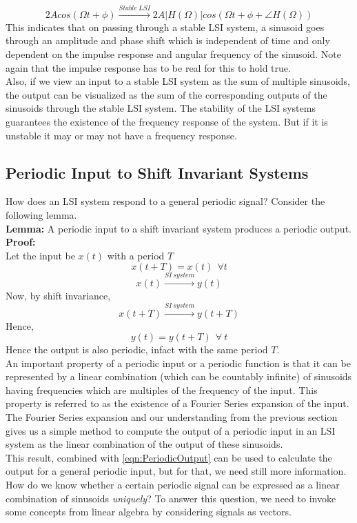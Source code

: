 \[
2Acos(\Omega t + \phi) \xrightarrow{Stable\ LSI} 2A|H(\Omega)|cos(\Omega t + \phi + \angle H(\Omega))
\]
This indicates that on passing through a stable LSI system, a sinusoid goes through an amplitude and phase shift which is independent of time and only dependent on the impulse response and angular frequency of the sinusoid. Note again that the impulse response has to be real for this to hold true.\\
Also, if we view an input to a stable LSI system as the sum of multiple sinusoids, the output can be visualized as the sum of the corresponding outputs of the sinusoids through the stable LSI system. The stability of the LSI systems guarantees the existence of the frequency response of the system. But if it is unstable it may or may not have a frequency response.
\subsection{Periodic Input to Shift Invariant Systems}
How does an LSI system respond to a general periodic signal? Consider the following lemma.\\
\textbf{Lemma:} A periodic input to a shift invariant system produces a periodic output.\\
\textbf{Proof:}\\
Let the input be $x(t)$ with a period $T$
\[x(t+T) = x(t)\ \ \forall t\]
\[x(t) \xrightarrow{SI\ system} y(t) \]
Now, by shift invariance,
\[x(t+T) \xrightarrow{SI\ system} y(t+T) \]
Hence,
\begin{equation}\label{eqn:PeriodicOutput}
y(t) = y(t+T)\ \ \forall \ t
\end{equation}
Hence the output is also periodic, infact with the same period $T$.\\
An important property of a periodic input or a periodic function is that it can be represented by a linear combination (which can be countably infinite) of sinusoids having frequencies which are multiples of the frequency of the input. This property is referred to as the existence of a Fourier Series expansion of the input. \\
The Fourier Series expansion and our understanding from the previous section gives us a simple method to compute the output of a periodic input in an LSI system as the linear combination of the output of these sinusoids.\\
This result, combined with \ref{eqn:PeriodicOutput} can be used to calculate the output for a general periodic input, but for that, we need still more information. How do we know whether a certain periodic signal can be expressed as a linear combination of sinusoids \emph{uniquely}? To answer this question, we need to invoke some concepts from linear algebra by considering signals as vectors.

